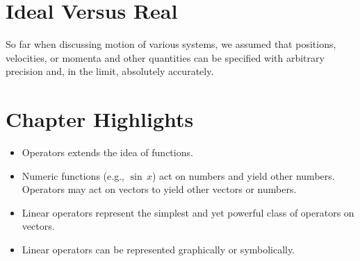 \section{Ideal Versus Real}\label{sec:IdealVsReal}
So far when discussing motion of various systems, we assumed that positions, velocities, or momenta and other quantities can be specified with arbitrary precision and, in the limit, absolutely accurately.


\section*{Chapter Highlights}
{\chhc
  \it  
\begin{itemize}
\item Operators extends the idea of functions.
\item Numeric functions (e.g., $\sin\,x$) act on numbers and yield
  other numbers. Operators may act on vectors to yield other vectors
  or numbers.
\item Linear operators represent the simplest and yet powerful class
  of operators on vectors.
\item Linear operators can be represented graphically or symbolically.
\end{itemize}

}
